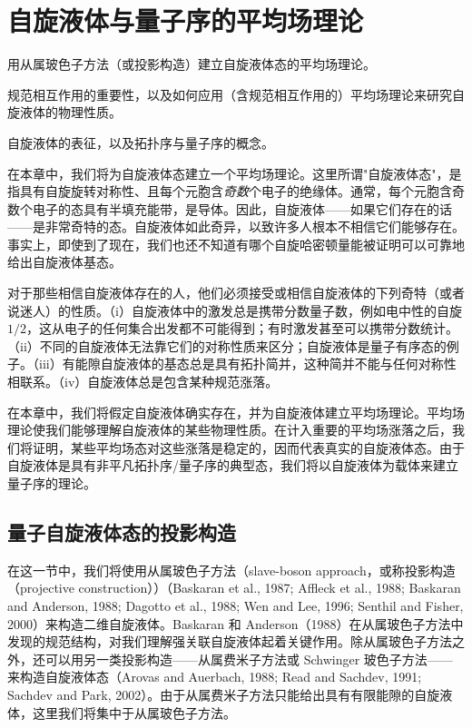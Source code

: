 

\chapter{自旋液体与量子序的平均场理论}

\begin{keypoints}
\item 用从属玻色子方法（或投影构造）建立自旋液体态的平均场理论。
\item 规范相互作用的重要性，以及如何应用（含规范相互作用的）平均场理论来研究自旋液体的物理性质。
\item 自旋液体的表征，以及拓扑序与量子序的概念。
\end{keypoints}

在本章中，我们将为自旋液体态建立一个平均场理论。这里所谓"自旋液体态"，是指具有自旋旋转对称性、且每个元胞含\emph{奇数}个电子的绝缘体。通常，每个元胞含奇数个电子的态具有半填充能带，是导体。因此，自旋液体——如果它们存在的话——是非常奇特的态。自旋液体如此奇异，以致许多人根本不相信它们能够存在。事实上，即使到了现在，我们也还不知道有哪个自旋哈密顿量能被证明可以可靠地给出自旋液体基态。

对于那些相信自旋液体存在的人，他们必须接受或相信自旋液体的下列奇特（或者说迷人）的性质。（i）自旋液体中的激发总是携带分数量子数，例如电中性的自旋 $1/2$，这从电子的任何集合出发都不可能得到；有时激发甚至可以携带分数统计。（ii）不同的自旋液体无法靠它们的对称性质来区分；自旋液体是量子有序态的例子。（iii）有能隙自旋液体的基态总是具有拓扑简并，这种简并不能与任何对称性相联系。（iv）自旋液体总是包含某种规范涨落。

在本章中，我们将假定自旋液体确实存在，并为自旋液体建立平均场理论。平均场理论使我们能够理解自旋液体的某些物理性质。在计入重要的平均场涨落之后，我们将证明，某些平均场态对这些涨落是稳定的，因而代表真实的自旋液体态。由于自旋液体是具有非平凡拓扑序/量子序的典型态，我们将以自旋液体为载体来建立量子序的理论。

\section{量子自旋液体态的投影构造}

在这一节中，我们将使用从属玻色子方法（slave-boson approach，或称投影构造（projective construction））（Baskaran et al., 1987; Affleck et al., 1988; Baskaran and Anderson, 1988; Dagotto et al., 1988; Wen and Lee, 1996; Senthil and Fisher, 2000）来构造二维自旋液体。Baskaran 和 Anderson（1988）在从属玻色子方法中发现的规范结构，对我们理解强关联自旋液体起着关键作用。除从属玻色子方法之外，还可以用另一类投影构造——从属费米子方法或 Schwinger 玻色子方法——来构造自旋液体态（Arovas and Auerbach, 1988; Read and Sachdev, 1991; Sachdev and Park, 2002）。由于从属费米子方法只能给出具有有限能隙的自旋液体，这里我们将集中于从属玻色子方法。

